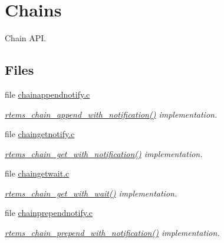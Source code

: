 \hypertarget{group__ClassicChains}{}\section{Chains}
\label{group__ClassicChains}


Chain A\+PI.  


\subsection*{Files}
\begin{DoxyCompactItemize}
\item 
file \mbox{\hyperlink{chainappendnotify_8c}{chainappendnotify.\+c}}
\begin{DoxyCompactList}\small\item\em \mbox{\hyperlink{group__ClassicChains_gaa7f797fb91aa37852b3e02dd97ff4e24}{rtems\+\_\+chain\+\_\+append\+\_\+with\+\_\+notification()}} implementation. \end{DoxyCompactList}\item 
file \mbox{\hyperlink{chaingetnotify_8c}{chaingetnotify.\+c}}
\begin{DoxyCompactList}\small\item\em \mbox{\hyperlink{group__ClassicChains_gae041dcf53508f057ea88b8f106cac330}{rtems\+\_\+chain\+\_\+get\+\_\+with\+\_\+notification()}} implementation. \end{DoxyCompactList}\item 
file \mbox{\hyperlink{chaingetwait_8c}{chaingetwait.\+c}}
\begin{DoxyCompactList}\small\item\em \mbox{\hyperlink{group__ClassicChains_ga034868a839c5ad15e0437731730d3abb}{rtems\+\_\+chain\+\_\+get\+\_\+with\+\_\+wait()}} implementation. \end{DoxyCompactList}\item 
file \mbox{\hyperlink{chainprependnotify_8c}{chainprependnotify.\+c}}
\begin{DoxyCompactList}\small\item\em \mbox{\hyperlink{group__ClassicChains_ga3efb7679b69706b9fc53a1d5547dd5f4}{rtems\+\_\+chain\+\_\+prepend\+\_\+with\+\_\+notification()}} implementation. \end{DoxyCompactList}\end{DoxyCompactItemize}
